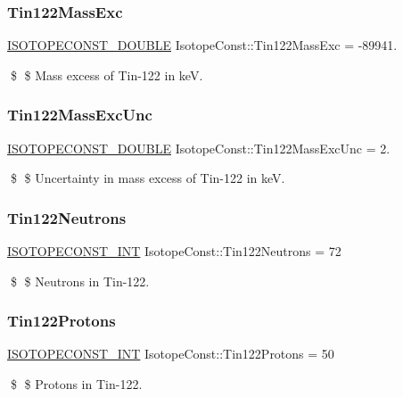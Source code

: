 \subsubsection{\texorpdfstring{Tin122\+Mass\+Exc}{Tin122MassExc}}
{\footnotesize\ttfamily \mbox{\hyperlink{group___isotope_const-_macros_ga8f45a7272ce02c0b4c65c44636ed719a}{I\+S\+O\+T\+O\+P\+E\+C\+O\+N\+S\+T\+\_\+\+D\+O\+U\+B\+LE}} Isotope\+Const\+::\+Tin122\+Mass\+Exc = -\/89941.}

\$ \$ Mass excess of Tin-\/122 in keV. \mbox{\label{group___isotope_const-_tin-_sn122_gaad40ed718782509cf145548941b32eae}} 
\subsubsection{\texorpdfstring{Tin122\+Mass\+Exc\+Unc}{Tin122MassExcUnc}}
{\footnotesize\ttfamily \mbox{\hyperlink{group___isotope_const-_macros_ga8f45a7272ce02c0b4c65c44636ed719a}{I\+S\+O\+T\+O\+P\+E\+C\+O\+N\+S\+T\+\_\+\+D\+O\+U\+B\+LE}} Isotope\+Const\+::\+Tin122\+Mass\+Exc\+Unc = 2.}

\$ \$ Uncertainty in mass excess of Tin-\/122 in keV. \mbox{\label{group___isotope_const-_tin-_sn122_ga5accf23059bd80469f93cb356b5280df}} 
\subsubsection{\texorpdfstring{Tin122\+Neutrons}{Tin122Neutrons}}
{\footnotesize\ttfamily \mbox{\hyperlink{group___isotope_const-_macros_ga5f18360b3e99483a35c32d789e62621c}{I\+S\+O\+T\+O\+P\+E\+C\+O\+N\+S\+T\+\_\+\+I\+NT}} Isotope\+Const\+::\+Tin122\+Neutrons = 72}

\$ \$ Neutrons in Tin-\/122. \mbox{\label{group___isotope_const-_tin-_sn122_ga64284a7193cac97e82b818882271f259}} 
\subsubsection{\texorpdfstring{Tin122\+Protons}{Tin122Protons}}
{\footnotesize\ttfamily \mbox{\hyperlink{group___isotope_const-_macros_ga5f18360b3e99483a35c32d789e62621c}{I\+S\+O\+T\+O\+P\+E\+C\+O\+N\+S\+T\+\_\+\+I\+NT}} Isotope\+Const\+::\+Tin122\+Protons = 50}

\$ \$ Protons in Tin-\/122. 